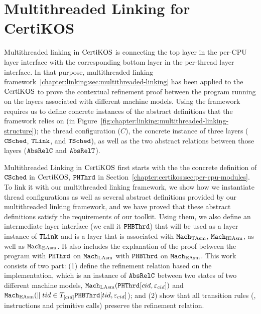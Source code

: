 \section{Multithreaded Linking for CertiKOS}
\label{chapter:certikos:sec:multithreaded-linking-for-certikos}


Multithreaded linking in $\mathrm{CertiKOS}$ is connecting the top layer in the per-CPU layer interface with
the corresponding bottom layer in the per-thread layer interface. 
In that purpose, multithreaded linking framework~\ref{chapter:linking:sec:multithreaded-linking} 
has been applied to the $\mathrm{CertiKOS}$ to prove the contextual refinement proof between the program running on the layers associated with different machine models.
Using the framework requires us to define concrete instances 
of the abstract definitions that the framework relies on (in Figure~\ref{fig:chapter:linking:multithreaded-linking-structure});
the thread configuration ($C$), the concrete instance of three layers (${{\mathrm{\texttt{CSched}}}}$, ${{\mathrm{\texttt{TLink}}}}$, and ${{\mathrm{\texttt{TSched}}}}$), 
as well as the two abstract relations between those layers (${\mathrm{\texttt{AbsRelC}}}$ and ${\mathrm{\texttt{AbsRelT}}}$). 

Multithreaded Linking in $\mathrm{CertiKOS}$ first starts with the the concrete definition of ${{\mathrm{\texttt{CSched}}}}$ in $\mathrm{CertiKOS}$, ${\mathrm{\texttt{PHThrd}}}$ in Section~\ref{chapter:certikos:sec:per-cpu-modules}.
To link it with our multithreaded linking framework,
we show how we instantiate thread configurations as well as several abstract definitions provided by our multithreaded linking framework, and we have proved that these abstract definitions satisfy the requirements of our toolkit.
Using them, we also define an intermediate layer interface (we call it ${\mathrm{\texttt{PHBThrd}}}$) that will be used as a layer instance of ${{\mathrm{\texttt{TLink}}}}$ and is a layer that is associated with ${\mathrm{\texttt{Mach}}}_{\mathrm{TAsm}}$, ${\mathrm{\texttt{Mach}}}_{\mathrm{IEAsm}}$, as well as ${\mathrm{\texttt{Mach}}}_{\mathrm{EAsm}}$.
It also includes  the explanation of the proof between the program with  ${\mathrm{\texttt{PHThrd}}}$ on ${\mathrm{\texttt{Mach}}}_{\mathrm{LAsm}}$ 
with ${\mathrm{\texttt{PHBThrd}}}$ on ${\mathrm{\texttt{Mach}}}_{\mathrm{EAsm}}$. 
This work consists of two part:  (1) define the refinement relation based on the implementation, which is an instance of ${\mathrm{\texttt{AbsRelC}}}$ between two states of two different machine models,
${\mathrm{\texttt{Mach}}}_{\mathrm{LAsm}}({\mathrm{\texttt{PHThrd}}}[cid, {\varepsilon}_{cid}])$ and 
${\mathrm{\texttt{Mach}}}_{\mathrm{EAsm}}(\parallel tid \in T_{[cid]} {\mathrm{\texttt{PHBThrd}}}[tid, {\varepsilon}_{cid}]$); and 
(2) show that all transition rules (\ie, instructions and primitive calls) preserve the refinement relation. 


